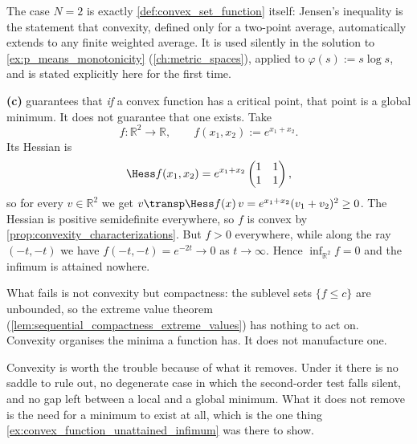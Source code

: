 \begin{remark}
The case $N=2$ is exactly \cref{def:convex_set_function} itself: Jensen's inequality is the
statement that convexity, defined only for a two-point average, automatically extends to any
finite weighted average. It is used silently in the solution to \cref{ex:p_means_monotonicity}
(\cref{ch:metric_spaces}), applied to $\varphi(s):=s\log s$, and is stated explicitly here for
the first time.
\end{remark}

\begin{example}
\label{ex:convex_function_unattained_infimum}
\textbf{(c)} guarantees that \emph{if} a convex function has
a critical point, that point is a global minimum. It does not guarantee that one exists. Take
\[f : \mathbb{R}^2 \to \mathbb{R}, \qquad f(x_1,x_2) := e^{x_1+x_2}.\]
Its Hessian is
\[\Hess f(x_1,x_2) = e^{x_1+x_2}\begin{pmatrix} 1 & 1 \\ 1 & 1\end{pmatrix},\]
so for every $v \in \mathbb{R}^2$ we get
$v\transp\Hess f(x)\,v = e^{x_1+x_2}(v_1+v_2)^2 \geq 0$. The Hessian is positive semidefinite
everywhere, so $f$ is convex by \cref{prop:convexity_characterizations}. But $f > 0$ everywhere,
while along the ray $(-t,-t)$ we have $f(-t,-t) = e^{-2t} \to 0$ as $t \to \infty$. Hence
$\inf_{\mathbb{R}^2}f = 0$ and the infimum is attained nowhere.

What fails is not convexity but compactness: the sublevel sets $\{f \leq c\}$ are unbounded, so
the extreme value theorem (\cref{lem:sequential_compactness_extreme_values}) has nothing to act
on. Convexity organises the minima a function has. It does not manufacture one.
\end{example}

Convexity is worth the trouble because of what it removes. Under it there is no saddle to rule
out, no degenerate case in which the second-order test falls silent, and no gap left between a
local and a global minimum. What it does not remove is the need for a minimum to exist at all,
which is the one thing \cref{ex:convex_function_unattained_infimum} was there to show.


